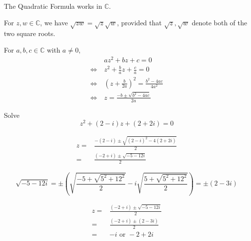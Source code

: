 
\begin{note}
The Quadratic Formula works in $\mathbb{C}$.

For $z,w\in\mathbb{C}$, we have $\sqrt{zw} =\sqrt{z} \sqrt{w}$, provided that $\sqrt{z},\sqrt{w}$ denote both of the two square roots.
\end{note}

For $a,b,c\in\mathbb{C}$ with $a\neq 0$, 
\begin{align*}
    & az^2+bz + c = 0 \\
   \Longleftrightarrow\ & z^2 + \frac{b}{a}z + \frac{c}{a} = 0\\
   \Longleftrightarrow\ & (z + \frac{b}{2a})^2 = \frac{b^2-4ac}{4a^2}\\
   \Longleftrightarrow\ & z = \frac{-b \pm \sqrt{b^2-4ac}}{2a}
\end{align*}

\begin{exmp}
Solve \[z^2 + (2-i)z + (2+2i) = 0\]
\end{exmp}

\begin{solution}
\begin{align*}
z =& \frac{-(2-i) \pm \sqrt{(2-i)^2-4(2+2i)}}{2}\\
= & \frac{(-2+i) \pm \sqrt{-5-12i}}{2}
\end{align*}

\[\sqrt{-5-12i} = \pm \left( \sqrt{\frac{-5 + \sqrt{5^2+12^2}}{2}} - i \sqrt{\frac{5 + \sqrt{5^2+12^2}}{2}} \right) = \pm(2-3i)\]

\begin{align*}
z =& \frac{(-2+i) \pm \sqrt{-5-12i}}{2} \\
= & \frac{(-2+i) \pm (2-3i)}{2} \\
= & -i \text{ or } -2 + 2i
\end{align*}
\end{solution}


